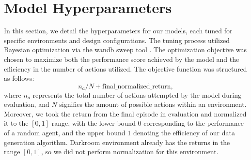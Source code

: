 \documentclass{article}
\theoremstyle{plain}
\theoremstyle{definition}
\theoremstyle{remark}
\begin{document}
\section{Model Hyperparameters}
\label{appendix:hypers}
In this section, we detail the hyperparameters for our models, each tuned for specific environments and design configurations. The tuning process utilized Bayesian optimization via the wandb sweep tool \citep{wandb}. The optimization objective was chosen to maximize both the performance score achieved by the model and the efficiency in the number of actions utilized. The objective function was structured as follows:
\[
n_a/N + \text{final\_normalized\_return},
\]
where $n_a$ represents the total number of actions attempted by the model during evaluation, and $N$ signifies the amount of possible actions within an environment. Moreover, we took the return from the final episode in evaluation and normalized it to the $[0,1]$ range, with the lower bound $0$ corresponding to the performance of a random agent, and the upper bound $1$ denoting the efficiency of our data generation algorithm. Darkroom environment already has the returns in the range $[0,1]$, so we did not perform normalization for this environment.
\end{document}

